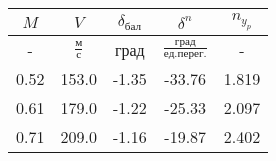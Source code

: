 \begin{tabular}{|c|c|c|c|c|}
\hline
$M$ & $V$ & $\delta_{бал}$ & $\delta^{n}$ & $n_{y_{p}}$ \\ 
\hline
- & $\frac{м}{с}$ & град & $\frac{град}{ед.перег.}$ & - \\ 
\hline
0.52 & 153.0 & -1.35 & -33.76 & 1.819 \\ 
\hline
0.61 & 179.0 & -1.22 & -25.33 & 2.097 \\ 
\hline
0.71 & 209.0 & -1.16 & -19.87 & 2.402 \\ 
\hline
\end{tabular}